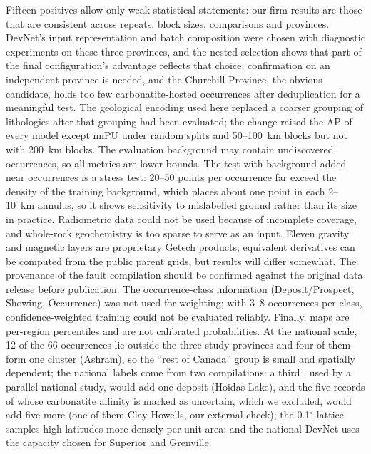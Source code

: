\documentclass[pdflatex,sn-apa]{sn-jnl}
\begin{document}
Fifteen positives allow only weak statistical statements: our firm results are those that are consistent across repeats, block sizes, comparisons and provinces. DevNet's input representation and batch composition were chosen with diagnostic experiments on these three provinces, and the nested selection shows that part of the final configuration's advantage reflects that choice; confirmation on an independent province is needed, and the Churchill Province, the obvious candidate, holds too few carbonatite-hosted occurrences after deduplication for a meaningful test. The geological encoding used here replaced a coarser grouping of lithologies after that grouping had been evaluated; the change raised the AP of every model except nnPU under random splits and 50--100~km blocks but not with 200~km blocks. The evaluation background may contain undiscovered occurrences, so all metrics are lower bounds. The test with background added near occurrences is a stress test: 20--50 points per occurrence far exceed the density of the training background, which places about one point in each 2--10~km annulus, so it shows sensitivity to mislabelled ground rather than its size in practice. Radiometric data could not be used because of incomplete coverage, and whole-rock geochemistry is too sparse to serve as an input. Eleven gravity and magnetic layers are proprietary Getech products; equivalent derivatives can be computed from the public parent grids, but results will differ somewhat. The provenance of the fault compilation should be confirmed against the original data release before publication. The occurrence-class information (Deposit/Prospect, Showing, Occurrence) was not used for weighting; with 3--8 occurrences per class, confidence-weighted training could not be evaluated reliably. Finally, maps are per-region percentiles and are not calibrated probabilities. At the national scale, 12 of the 66 occurrences lie outside the three study provinces and four of them form one cluster (Ashram), so the ``rest of Canada'' group is small and spatially dependent; the national labels come from two compilations: a third \citep{Huston2024}, used by a parallel national study, would add one deposit (Hoidas Lake), and the five records of \citet{Orris2018} whose carbonatite affinity is marked as uncertain, which we excluded, would add five more (one of them Clay-Howells, our external check); the 0.1$^\circ$ lattice samples high latitudes more densely per unit area; and the national DevNet uses the capacity chosen for Superior and Grenville.

\end{document}
